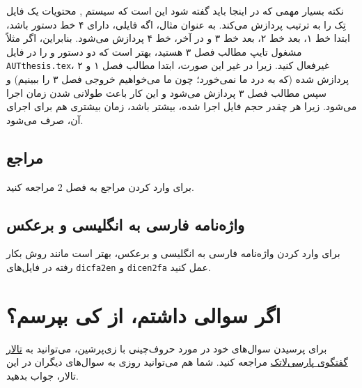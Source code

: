 نکته بسیار مهمی که در اینجا باید گفته شود این است که سیستم
\lr{\TeX},
محتویات یک فایل تِک را به ترتیب پردازش می‌کند. به عنوان مثال، اگه فایلی، دارای ۴ خط دستور باشد، ابتدا خط ۱، بعد خط ۲، بعد خط ۳ و در آخر، خط ۴ پردازش می‌شود. بنابراین، اگر مثلاً مشغول تایپ مطالب فصل ۳ هستید، بهتر است
که دو دستور
\verb~~
و
\verb~~
را در فایل 
\verb~AUTthesis.tex~،
غیرفعال%
 کنید. زیرا در غیر این صورت، ابتدا مطالب فصل ۱ و ۲ پردازش شده (که به درد ما نمی‌خورد؛ چون ما می‌خواهیم خروجی فصل ۳ را ببینیم) و سپس مطالب فصل ۳ پردازش می‌شود و این کار باعث طولانی شدن زمان اجرا می‌شود. زیرا هر چقدر حجم فایل اجرا شده، بیشتر باشد، زمان بیشتری هم برای اجرای آن، صرف می‌شود.

\subsection{مراجع}
برای وارد کردن مراجع به فصل 2
مراجعه کنید.
\subsection{واژه‌نامه فارسی به انگلیسی و برعکس}
برای وارد کردن واژه‌نامه فارسی به انگلیسی و برعکس، بهتر است مانند روش بکار رفته در فایل‌های 
\verb;dicfa2en;
و
\verb;dicen2fa;
عمل کنید.

\section{اگر سوالی داشتم، از کی بپرسم؟}
برای پرسیدن سوال‌های خود در مورد حروف‌چینی با زی‌پرشین،  می‌توانید به
 \href{http://forum.parsilatex.com}{تالار گفتگوی پارسی‌لاتک}%
مراجعه کنید. شما هم می‌توانید روزی به سوال‌های دیگران در این تالار، جواب بدهید.
